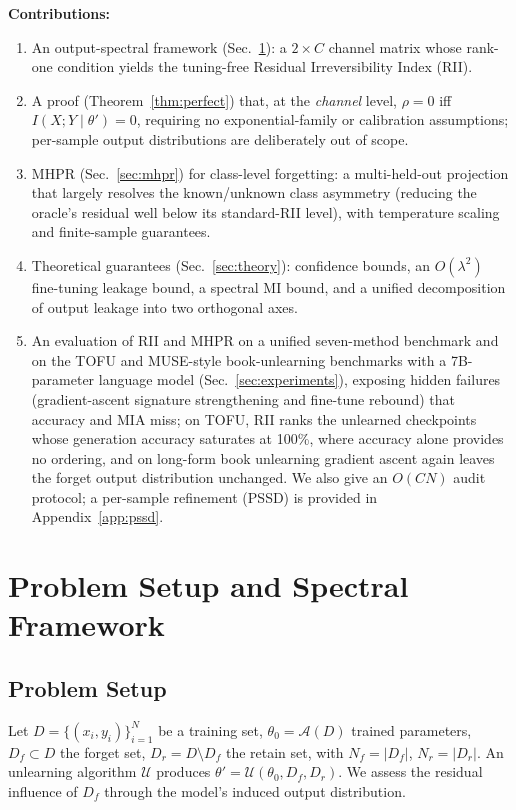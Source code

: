 \documentclass[smallextended]{svjour3}       %
\begin{document}
\textbf{Contributions:}
\begin{enumerate}
\item An output-spectral framework (Sec.~\ref{sec:channel}): a $2\times C$ channel matrix whose rank-one condition yields the tuning-free Residual Irreversibility Index (RII).
\item A proof (Theorem~\ref{thm:perfect}) that, at the \emph{channel} level, $\rho=0$ iff $I(X;Y\mid\theta')=0$, requiring no exponential-family or calibration assumptions; per-sample output distributions are deliberately out of scope.
\item MHPR (Sec.~\ref{sec:mhpr}) for class-level forgetting: a multi-held-out projection that largely resolves the known/unknown class asymmetry (reducing the oracle's residual well below its standard-RII level), with temperature scaling and finite-sample guarantees.
\item Theoretical guarantees (Sec.~\ref{sec:theory}): confidence bounds, an $O(\lambda^2)$ fine-tuning leakage bound, a spectral MI bound, and a unified decomposition of output leakage into two orthogonal axes.
\item An evaluation of RII and MHPR on a unified seven-method benchmark and on the TOFU and MUSE-style book-unlearning benchmarks with a 7B-parameter language model (Sec.~\ref{sec:experiments}), exposing hidden failures (gradient-ascent signature strengthening and fine-tune rebound) that accuracy and MIA miss; on TOFU, RII ranks the unlearned checkpoints whose generation accuracy saturates at 100\%, where accuracy alone provides no ordering, and on long-form book unlearning gradient ascent again leaves the forget output distribution unchanged. We also give an $O(CN)$ audit protocol; a per-sample refinement (PSSD) is provided in Appendix~\ref{app:pssd}.
\end{enumerate}

\section{Problem Setup and Spectral Framework}
\label{sec:channel}

\subsection{Problem Setup}

Let $D = \{(x_i, y_i)\}_{i=1}^N$ be a training set, $\theta_0 = \mathcal{A}(D)$ trained parameters, $D_f \subset D$ the forget set, $D_r = D \setminus D_f$ the retain set, with $N_f = |D_f|$, $N_r = |D_r|$. An unlearning algorithm $\mathcal{U}$ produces $\theta' = \mathcal{U}(\theta_0, D_f, D_r)$. We assess the residual influence of $D_f$ through the model's induced output distribution.
\end{document}
